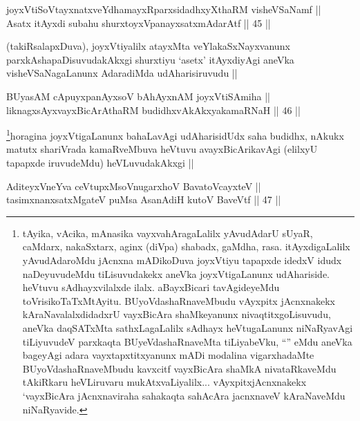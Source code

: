 
\begin{shl}
joyxVtiSoV\s tayxnatxveYdhamayxRparxsidadhxyXthaRM visheVSaNamf || \\
Asatx itAyxdi subahu shurxtoyxVpanayxsatxmAdarAtf ||  45 ||  
\end{shl}

\begin{artha}
(takiRsalapxDuva), joyxVtiyalilx atayxMta veYlakaSxNayxvanunx parxkAshapaDisuvudakAkxgi shurxtiyu `asetx' itAyxdiyAgi aneVka visheVSaNagaLanunx AdaradiMda udAharisiruvudu ||
\end{artha}




\begin{shl}
BUyasAM cApuyxpanAyxsoV bAhAyxnAM joyxVtiSAmiha || \\
liknagxsAyxvayxBicArAthaRM budidhxvAkAkxyakamaRNaH ||  46 ||  
\end{shl}

\begin{artha}
\footnote{tAyika, vAcika, mAnasika vayxvahAragaLalilx yAvudAdarU sUyaR, caMdarx, nakaSxtarx, aginx (diVpa) shabadx, gaMdha, rasa. itAyxdigaLalilx  yAvudAdaroMdu jAcnxna mADikoDuva joyxVtiyu tapapxde idedxV idudx naDeyuvudeMdu tiLisuvudakekx aneVka joyxVtigaLanunx udAhariside. heVtuvu sAdhayxvilalxde ilalx. aBayxBicari tavAgideyeMdu toVrisikoTaTxMtAyitu. BUyoVdashaRnaveMbudu vAyxpitx jAcnxnakekx kAraNavalalxdidadxrU vayxBicAra shaMkeyanunx nivaqtitxgoLisuvudu, aneVka daqSATxMta sathxLagaLalilx sAdhayx heVtugaLanunx niNaRyavAgi tiLiyuvudeV parxkaqta BUyeVdashaRnaveMta tiLiyabeVku, ``\stext'' eMdu aneVka bageyAgi adara vayxtapxtitxyanunx mADi modalina vigarxhadaMte BUyoVdashaRnaveMbudu kavxcitf vayxBicAra shaMkA nivataRkaveMdu tAkiRkaru heVLiruvaru mukAtxvaLiyalilx... vAyxpitxjAcnxnakekx `vayxBicAra jAcnxnaviraha sahakaqta sahAcAra jacnxnaveV kAraNaveMdu niNaRyavide.}horagina joyxVtigaLanunx bahaLavAgi udAharisidUdx saha budidhx, nAkukx matutx shariVrada kamaRveMbuva heVtuvu avayxBicArikavAgi (elilxyU tapapxde iruvudeMdu) heVLuvudakAkxgi ||
\end{artha}


\begin{shl}
AditeyxVneYva ceVtupxMsoV\s nugarxhoV BavatoVcayxteV || \\
tasimxnanxsatxMgateV puMsa AsanAdiH kutoV BaveVtf ||  47 ||  
\end{shl}

